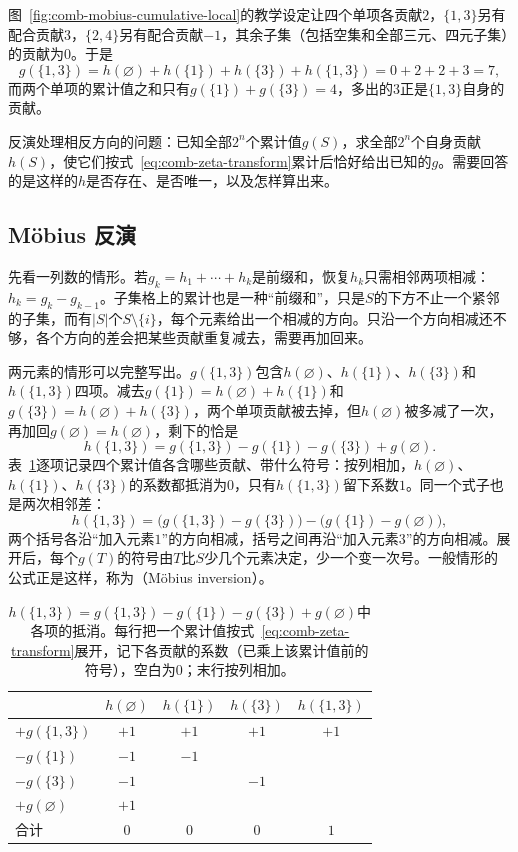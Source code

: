图~\ref{fig:comb-mobius-cumulative-local}的教学设定让四个单项各贡献$2$，$\{1,3\}$另有配合贡献$3$，$\{2,4\}$另有配合贡献$-1$，其余子集（包括空集和全部三元、四元子集）的贡献为$0$。于是
\[
  g(\{1,3\})=h(\varnothing)+h(\{1\})+h(\{3\})+h(\{1,3\})=0+2+2+3=7,
\]
而两个单项的累计值之和只有$g(\{1\})+g(\{3\})=4$，多出的$3$正是$\{1,3\}$自身的贡献。

反演处理相反方向的问题：已知全部$2^n$个累计值$g(S)$，求全部$2^n$个自身贡献$h(S)$，使它们按式~\eqref{eq:comb-zeta-transform}累计后恰好给出已知的$g$。需要回答的是这样的$h$是否存在、是否唯一，以及怎样算出来。

\subsection{Möbius 反演}
\label{sec:graph-setfn-mobius-inversion}

先看一列数的情形。若$g_k=h_1+\cdots+h_k$是前缀和，恢复$h_k$只需相邻两项相减：$h_k=g_k-g_{k-1}$。子集格上的累计也是一种“前缀和”，只是$S$的下方不止一个紧邻的子集，而有$|S|$个$S\setminus\{i\}$，每个元素给出一个相减的方向。只沿一个方向相减还不够，各个方向的差会把某些贡献重复减去，需要再加回来。

两元素的情形可以完整写出。$g(\{1,3\})$包含$h(\varnothing)$、$h(\{1\})$、$h(\{3\})$和$h(\{1,3\})$四项。减去$g(\{1\})=h(\varnothing)+h(\{1\})$和$g(\{3\})=h(\varnothing)+h(\{3\})$，两个单项贡献被去掉，但$h(\varnothing)$被多减了一次，再加回$g(\varnothing)=h(\varnothing)$，剩下的恰是
\[
  h(\{1,3\})=g(\{1,3\})-g(\{1\})-g(\{3\})+g(\varnothing).
\]
表~\ref{tab:graph-setfn-mobius-cancellation}逐项记录四个累计值各含哪些贡献、带什么符号：按列相加，$h(\varnothing)$、$h(\{1\})$、$h(\{3\})$的系数都抵消为$0$，只有$h(\{1,3\})$留下系数$1$。同一个式子也是两次相邻差：
\[
  h(\{1,3\})=\bigl(g(\{1,3\})-g(\{3\})\bigr)-\bigl(g(\{1\})-g(\varnothing)\bigr),
\]
两个括号各沿“加入元素$1$”的方向相减，括号之间再沿“加入元素$3$”的方向相减。展开后，每个$g(T)$的符号由$T$比$S$少几个元素决定，少一个变一次号。一般情形的公式正是这样，称为（Möbius inversion）。

\begin{table}[!htb]
  \centering
  \caption{$h(\{1,3\})=g(\{1,3\})-g(\{1\})-g(\{3\})+g(\varnothing)$中各项的抵消。每行把一个累计值按式~\eqref{eq:comb-zeta-transform}展开，记下各贡献的系数（已乘上该累计值前的符号），空白为$0$；末行按列相加。}
  \label{tab:graph-setfn-mobius-cancellation}
  \begin{tabular}{@{}lcccc@{}}
    \toprule
    & $h(\varnothing)$ & $h(\{1\})$ & $h(\{3\})$ & $h(\{1,3\})$ \\
    \midrule
    $+g(\{1,3\})$ & $+1$ & $+1$ & $+1$ & $+1$ \\
    $-g(\{1\})$ & $-1$ & $-1$ & & \\
    $-g(\{3\})$ & $-1$ & & $-1$ & \\
    $+g(\varnothing)$ & $+1$ & & & \\
    \midrule
    合计 & $0$ & $0$ & $0$ & $1$ \\
    \bottomrule
  \end{tabular}
\end{table}

